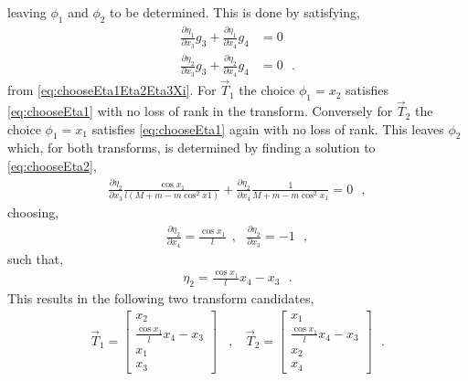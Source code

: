 leaving $\phi_1$ and $\phi_2$ to be determined. This is done by satisfying,
\begin{align}
  \frac{\partial \eta_1}{\partial x_3} g_3 + \frac{\partial \eta_1}{\partial x_4} g_4 &= 0       \label{eq:chooseEta1}  \\
  \frac{\partial \eta_2}{\partial x_3} g_3 + \frac{\partial \eta_2}{\partial x_4} g_4 &= 0       \label{eq:chooseEta2}  
  \ \ \ .
\end{align}
from \autoref{eq:chooseEta1Eta2Eta3Xi}. For $\vec{T}_1$ the choice $\phi_1 = x_2$ satisfies \autoref{eq:chooseEta1} with no loss of rank in the transform. Conversely for $\vec{T}_2$ the choice $\phi_1 = x_1$ satisfies \autoref{eq:chooseEta1} again with no loss of rank. This leaves $\phi_2$ which, for both transforms, is determined by finding a solution to \autoref{eq:chooseEta2},
\begin{align}
  \frac{\partial \eta_2}{\partial x_3} \frac{\cos x_1}{l (M + m - m \cos^2 x1)} + \frac{\partial \eta_2}{\partial x_4} \frac{1}{M + m - m \cos^2 x_1 } = 0 \ \ \ ,
\end{align}
choosing,
\begin{align}
  \frac{\partial \eta_2}{\partial x_4} = \frac{\cos x_1}{l}  \ \ , \ \ \ \frac{\partial \eta_2}{\partial x_3}  = -1 \ \ \ ,
\end{align}
such that,
\begin{align}
  \eta_2 =  \frac{\cos x_1}{l} x_4 - x_3 \ \ \ .
\end{align}
%
This results in the following two transform candidates,
\begin{align}
  \vec{T}_1 =
  \begin{bmatrix}
    x_2   \\
    \frac{\cos x_1}{l} x_4 - x_3  \\
    x_1   \\
    x_3
  \end{bmatrix} \ \ \ \ , \ \ \ \
  \vec{T}_2
  =
  \begin{bmatrix}
    x_1   \\
    \frac{\cos x_1}{l} x_4 - x_3   \\
    x_2   \\
    x_4
  \end{bmatrix} \ \ \ .
\end{align}
